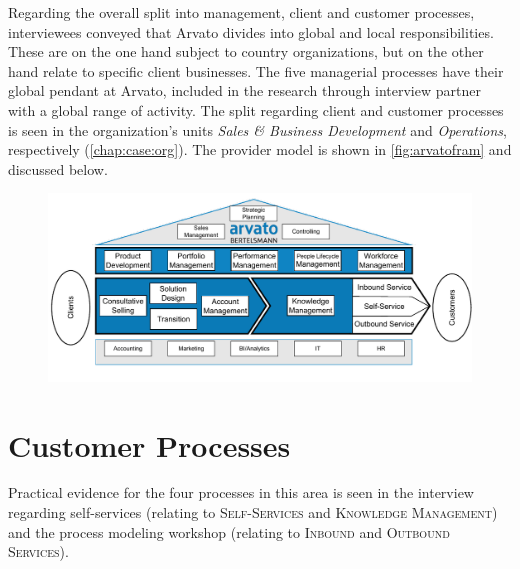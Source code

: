 	Regarding the overall split into management, client and customer processes, interviewees conveyed that Arvato divides into global and local responsibilities. These are on the one hand subject to country organizations, but on the other hand relate to specific client businesses. The five managerial processes have their global pendant at Arvato, included in the research through interview partner with a global range of activity. The split regarding client and customer processes is seen in the organization's units \textit{Sales \& Business Development} and \textit{Operations}, respectively (\cf \ref{chap:case:org}). The provider model is shown in \Fig \ref{fig:arvatofram} and discussed below.
	
\begin{figure}[caption={Arvato Framework}, label={fig:arvatofram}]
	{	\includegraphics[width=.98\textwidth]{figures/frameworkA.pdf} 
	}
\end{figure}


	
	\section{Customer Processes}
	
	Practical evidence for the four processes in this area is seen in the interview regarding self-services (relating to \textsc{Self-Services} and \textsc{Knowledge Management}) and the process modeling workshop (relating to \textsc{Inbound} and \textsc{Outbound Services}). 
